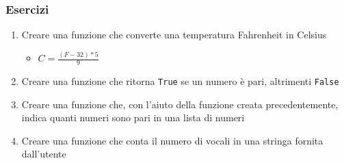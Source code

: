 \begin{exerciseframe}
    \frametitle{Esercizi}

    \begin{enumerate}
        \item Creare una funzione che converte una temperatura Fahrenheit in Celsius
        \begin{itemize}
            \item $C = \frac{(F - 32) * 5}{9}$
        \end{itemize}
        \pause
        \bigskip
        \item Creare una funzione che ritorna \texttt{True} se un numero è pari, altrimenti \texttt{False}
        \pause
        \bigskip
        \item Creare una funzione che, con l'aiuto della funzione creata precedentemente, indica quanti numeri sono pari in una lista di numeri
        \pause
        \bigskip
        \item Creare una funzione che conta il numero di vocali in una stringa fornita dall'utente
    \end{enumerate}
\end{exerciseframe}



        


